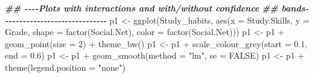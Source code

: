 \documentclass[
]{gitbook}
\newenvironment{Shaded}{\begin{snugshade}}{\end{snugshade}}
\newcommand{\AttributeTok}[1]{\textcolor[rgb]{0.77,0.63,0.00}{#1}}
\newcommand{\ConstantTok}[1]{\textcolor[rgb]{0.00,0.00,0.00}{#1}}
\newcommand{\DecValTok}[1]{\textcolor[rgb]{0.00,0.00,0.81}{#1}}
\newcommand{\DocumentationTok}[1]{\textcolor[rgb]{0.56,0.35,0.01}{\textbf{\textit{#1}}}}
\newcommand{\FloatTok}[1]{\textcolor[rgb]{0.00,0.00,0.81}{#1}}
\newcommand{\FunctionTok}[1]{\textcolor[rgb]{0.00,0.00,0.00}{#1}}
\newcommand{\NormalTok}[1]{#1}
\newcommand{\OtherTok}[1]{\textcolor[rgb]{0.56,0.35,0.01}{#1}}
\newcommand{\SpecialCharTok}[1]{\textcolor[rgb]{0.00,0.00,0.00}{#1}}
\newcommand{\StringTok}[1]{\textcolor[rgb]{0.31,0.60,0.02}{#1}}
\begin{document}
\begin{Shaded}
\begin{Highlighting}[]
\DocumentationTok{\#\# {-}{-}{-}{-}Plots with interactions and with/without confidence}
\DocumentationTok{\#\# bands{-}{-}{-}{-}{-}{-}{-}{-}{-}{-}{-}{-}{-}{-}{-}{-}{-}{-}{-}{-}{-}{-}{-}{-}{-}{-}{-}{-}{-}{-}}
\NormalTok{p1 }\OtherTok{\textless{}{-}} \FunctionTok{ggplot}\NormalTok{(Study\_habits, }\FunctionTok{aes}\NormalTok{(}\AttributeTok{x =}\NormalTok{ Study.Skills, }\AttributeTok{y =}\NormalTok{ Grade, }\AttributeTok{shape =} \FunctionTok{factor}\NormalTok{(Social.Net),}
    \AttributeTok{color =} \FunctionTok{factor}\NormalTok{(Social.Net)))}
\NormalTok{p1 }\OtherTok{\textless{}{-}}\NormalTok{ p1 }\SpecialCharTok{+} \FunctionTok{geom\_point}\NormalTok{(}\AttributeTok{size =} \DecValTok{2}\NormalTok{) }\SpecialCharTok{+} \FunctionTok{theme\_bw}\NormalTok{()}
\NormalTok{p1 }\OtherTok{\textless{}{-}}\NormalTok{ p1 }\SpecialCharTok{+} \FunctionTok{scale\_colour\_grey}\NormalTok{(}\AttributeTok{start =} \FloatTok{0.1}\NormalTok{, }\AttributeTok{end =} \FloatTok{0.6}\NormalTok{)}
\NormalTok{p1 }\OtherTok{\textless{}{-}}\NormalTok{ p1 }\SpecialCharTok{+} \FunctionTok{geom\_smooth}\NormalTok{(}\AttributeTok{method =} \StringTok{"lm"}\NormalTok{, }\AttributeTok{se =} \ConstantTok{FALSE}\NormalTok{)}
\NormalTok{p1 }\OtherTok{\textless{}{-}}\NormalTok{ p1 }\SpecialCharTok{+} \FunctionTok{theme}\NormalTok{(}\AttributeTok{legend.position =} \StringTok{"none"}\NormalTok{)}


\end{Highlighting}
\end{Shaded}
\end{document}
